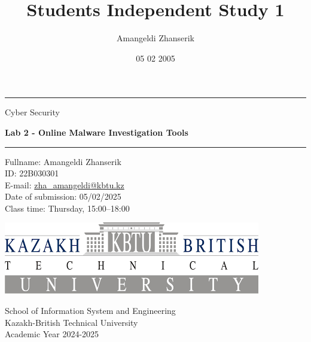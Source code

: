 \documentclass{article}
\title{Students Independent Study 1}
\author{Amangeldi Zhanserik}
\date{05 02 2005}
\begin{document}
\begin{titlepage}
    \centering

    \vspace*{1cm}

    \rule{\textwidth}{1pt}

    \vspace{2\baselineskip}

    {\huge  Cyber Security } \\

    \vspace{1\baselineskip}

    {\huge \textbf{ Lab 2 - Online Malware Investigation Tools }}

    \vspace{2\baselineskip}

    \rule{\textwidth}{1pt}

    \vspace{1cm}

    \large

    \begin{flushleft}
        \begin{minipage}{.8\textwidth}
            \raggedright
            Fullname: Amangeldi Zhanserik \\
            ID: 22B030301 \\
            E-mail: {\normalsize \url{zha_amangeldi@kbtu.kz}} \\
            Date of submission: 05/02/2025 \\
            Class time: Thursday, 15:00--18:00 \\
        \end{minipage}%
    \end{flushleft}

    \vspace{2cm}

    \includegraphics[width=.7\textwidth]{logo-kbtu.png}

    \vfill

    School of Information System and Engineering \\
    Kazakh-British Technical University \\
    Academic Year 2024-2025 \\
\end{titlepage}
\end{document}

